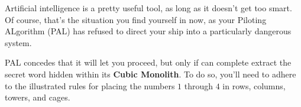 Artificial intelligence is a pretty useful tool, as long as it doesn't
get too smart. Of course, that's the situation you find yourself in now,
as your Piloting ALgorithm (PAL) has refused to direct your ship 
into a particularly dangerous system.

PAL concedes that it will let you proceed, but only if can complete
extract the secret word hidden within its \textbf{Cubic Monolith}.
To do so, you'll need to adhere to the illustrated rules for
placing the numbers \(1\) through \(4\) in rows, columns, towers, and cages.


